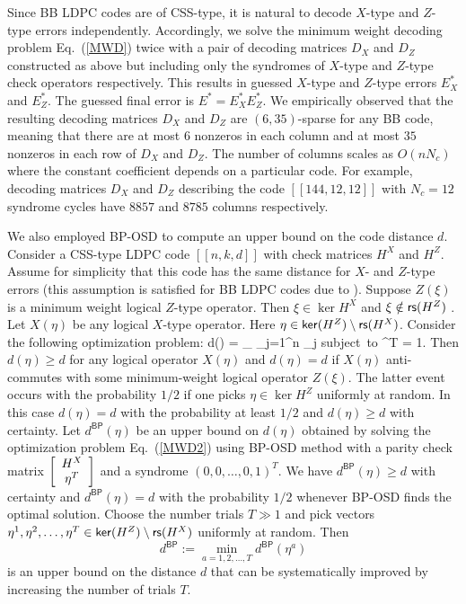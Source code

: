 \documentclass{article}
\begin{document}
Since BB LDPC codes are of CSS-type, it is natural to decode $X$-type and $Z$-type errors independently.
Accordingly, we solve the minimum weight decoding problem Eq.~(\ref{MWD}) twice
with a pair of decoding matrices $D_X$ and $D_Z$ constructed as above but including only the syndromes of $X$-type and $Z$-type check operators respectively. 
This results in guessed $X$-type and $Z$-type errors $E^*_X$ and $E^*_Z$.
The guessed final error is $E^*=E^*_X E^*_Z$.
We empirically observed that the resulting decoding matrices $D_X$ and $D_Z$
are $(6,35)$-sparse for any BB code, meaning that 
there are at most $6$ nonzeros in each column and at most $35$ nonzeros
in each row of $D_X$ and $D_Z$.
The number of columns  scales as $O(nN_c)$ where the constant coefficient
depends on a particular code. For example, decoding matrices $D_X$ and $D_Z$
describing the code $[[144,12,12]]$ with $N_c=12$ syndrome cycles
have $8857$ and $8785$ columns respectively.




We also employed BP-OSD to compute an upper bound on the code distance $d$.
Consider a  CSS-type LDPC code $[[n,k,d]]$ with check matrices
$H^X$ and $H^Z$.  Assume for simplicity that this code has the same
distance for $X$- and $Z$-type errors (this assumption is satisfied for BB
LDPC codes due to ).
Suppose
$Z(\xi)$ is a minimum weight logical $Z$-type operator.
Then $\xi \in \ker{H^X}$
and $\xi \notin \rs{H^Z}$
.
Let $X(\eta)$ be any logical $X$-type operator. 
Here $\eta \in \ker{H^Z}\setminus \rs{H^X}$.
Consider the following optimization problem:
\be
\label{MWD2}
d(\eta) =  \min_{\xi \in 
{}} \; \sum_{j=1}^n \xi_j
 \quad
\mbox{subject to} \quad
 \eta^T \xi = 1.
\ee
Then $d(\eta)\ge d$ for any logical
operator $X(\eta)$ and $d(\eta)=d$
if $X(\eta)$ anti-commutes with some minimum-weight logical operator $Z(\xi)$.
The latter event occurs with the probability $1/2$ if one
picks 
$\eta \in \ker{H^Z}$
 uniformly at random.
In this case
 $d(\eta)=d$
with the probability at least $1/2$
and $d(\eta)\ge d$ with certainty.
Let $d^{\mathsf{BP}}(\eta)$ be an upper bound on $d(\eta)$
obtained by solving the
optimization problem Eq.~(\ref{MWD2}) using BP-OSD method
with a parity check matrix $\left[ \ba{cc}
H^X \\
\eta^T\\
\ea
\right]$
and a syndrome $(0,0,\ldots,0,1)^T$.
We have $d^{\mathsf{BP}}(\eta)\ge d$
with certainty and
 $d^{\mathsf{BP}}(\eta)=d$
  with the probability $1/2$ whenever BP-OSD finds the optimal solution. 
Choose the number trials $T\gg 1$ and pick 
vectors $\eta^1,\eta^2,\ldots,\eta^T\in \ker{H^Z}\setminus \rs{H^X}$
uniformly at random. Then 
\[
d^{\mathsf{BP}} := \min_{a=1,2,\ldots,T} d^{\mathsf{BP}}(\eta^a)
\]
is an upper bound on the distance $d$ that can be systematically improved by 
increasing the number of trials $T$. 
\end{document}
